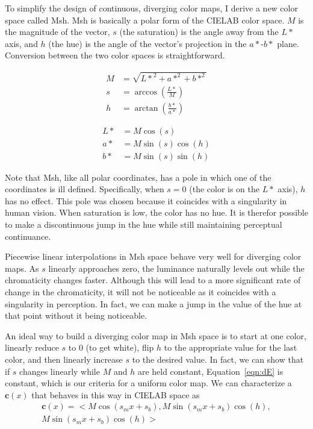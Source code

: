 \documentclass{vgtc}                          %
\newcommand{\Lab}{CIELAB\xspace}
\newcommand{\Msh}{Msh\xspace}
\newcommand*{\cvec}[1]{\mathbf{#1}}
\begin{document}
To simplify the design of continuous, diverging color maps, I derive a new
color space called \Msh.  \Msh is basically a polar form of the \Lab color
space.  $M$ is the magnitude of the vector, $s$ (the saturation) is the
angle away from the $L*$ axis, and $h$ (the hue) is the angle of the
vector's projection in the $a*$-$b*$ plane.  Conversion between the two
color spaces is straightforward.

\begin{equation}
  \begin{split}
    M &= \sqrt{{L*}^2 + a*^2 + b*^2} \\
    s &= \arccos\left(\frac{L*}{M}\right) \\
    h &= \arctan\left(\frac{b*}{a*}\right)
  \end{split}
  \label{eqn:LabToMsh}
\end{equation}

\begin{equation}
  \begin{split}
    L* &= M \cos\left(s\right) \\
    a* &= M \sin\left(s\right) \cos\left(h\right) \\
    b* &= M \sin\left(s\right) \sin\left(h\right)
  \end{split}
\end{equation}

Note that \Msh, like all polar coordinates, has a pole in which one of the
coordinates is ill defined.  Specifically, when $s = 0$ (the color is on
the $L*$ axis), $h$ has no effect.  This pole was chosen because it
coincides with a singularity in human vision.  When saturation is low, the
color has no hue.  It is therefor possible to make a discontinuous jump
in the hue while still maintaining perceptual continuance.

Piecewise linear interpolations in \Msh space behave very well for
diverging color maps.  As $s$ linearly approaches zero, the luminance
naturally levels out while the chromaticity changes faster.  Although this
will lead to a more significant rate of change in the chromaticity, it will
not be noticeable as it coincides with a singularity in perception.  In
fact, we can make a jump in the value of the hue at that point without it
being noticeable.

An ideal way to build a diverging color map in \Msh space is to start at
one color, linearly reduce $s$ to 0 (to get white), flip $h$ to the
appropriate value for the last color, and then linearly increase $s$ to the
desired value.  In fact, we can show that if $s$ changes linearly while $M$
and $h$ are held constant, Equation~\ref{eqn:dE} is constant, which is our
criteria for a uniform color map.  We can characterize a $\cvec{c}(x)$ that
behaves in this way in \Lab space as
\begin{multline}
  \cvec{c}(x) = < M \cos(s_m x + s_b), M \sin(s_m x + s_b) \cos(h), \\
  M \sin(s_m x + s_b) \cos(h) >
  \label{eqn:s_linear}
\end{multline}
\end{document}

